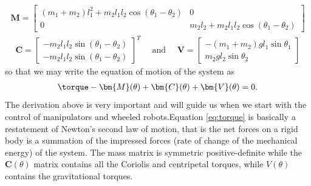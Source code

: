 %
\begin{align}
	\bm{M} = \begin{bmatrix}
	(m_1+m_2)l_1^2  + m_2 l_1 l_2 \cos(\theta_1 - \theta_2) &  0 \\
	0 & m_2 l_2 + m_2 l_1 l_2 \cos(\theta_1 - \theta_2) 
	\end{bmatrix}
\end{align}
%
\begin{align}
\bm{C} = 	\begin{bmatrix}
-  m_2 l_1 l_2 \sin(\theta_1 - \theta_2) \\
%
-  m_2 l_1 l_2 \sin(\theta_1 - \theta_2)
\end{bmatrix}^T \quad 
%
\text{ and } \quad 
%
	\bm{V} = 	\begin{bmatrix}
	- (m_1+m_2)g l_1  \sin \theta_1  \\
	m_2 g l_2 \sin \theta_2
	\end{bmatrix}
\end{align}
%
so that we may write the equation of motion of the system as 
%
\begin{align}
	\torque - \bm{M}(\theta) + \bm{C}( \theta) + \bm{V}(\theta) = 0.
	\label{eq:torque}
\end{align}
%
The derivation above is very important and will guide us when we start with the control of manipulators and wheeled robots.Equation \eqref{eq:torque} is basically a restatement of Newton's second law of motion, that is the net forces on a rigid body is a summation of the impressed forces (rate of change of the mechanical energy) of the system. The mass matrix is symmetric positive-definite while the $\bm{C}(\theta)$ matrix contains all the Coriolis and centripetal torques, while $V(\theta)$ contains the gravitational torques.

